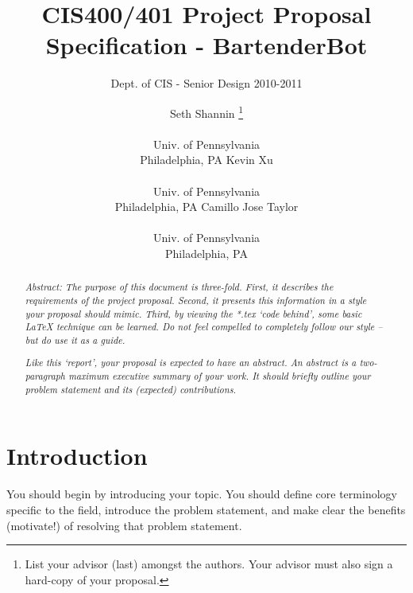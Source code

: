\documentclass{sig-alternate}
\begin{document}
 

\title{CIS400/401 Project Proposal Specification - BartenderBot}
\subtitle{Dept. of CIS - Senior Design 2010-2011}
\author{
\alignauthor Seth Shannin \thanks{List your advisor (last) amongst the authors. Your advisor must also sign a hard-copy of your proposal.} \\  \\ Univ. of Pennsylvania \\ Philadelphia, PA
\alignauthor Kevin Xu \\  \\ Univ. of Pennsylvania \\ Philadelphia, PA
\alignauthor Camillo Jose Taylor \\  \\ Univ. of Pennsylvania \\ Philadelphia, PA}
\date{}
\maketitle

\begin{abstract}
\textit{Abstract: The purpose of this document is three-fold. First, it describes the requirements of the project proposal. Second, it presents this information in a style your proposal should mimic. Third, by viewing the *.tex `code behind', some basic \LaTeX{} technique can be learned. Do not feel compelled to completely follow our style -- but do use it as a guide.}

\textit{Like this `report', your proposal is expected to have an abstract. An abstract is a two-paragraph maximum executive summary of your work. It should briefly outline your problem statement and its (expected) contributions.}
\end{abstract}

\section{Introduction}
\label{sec:intro}
You should begin by introducing your topic. You should define core terminology specific to the field, introduce the problem statement, and make clear the benefits (motivate!) of resolving that problem statement. 
\end{document}
